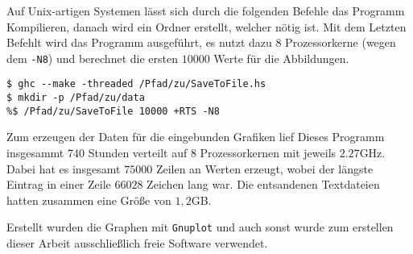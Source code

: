 Auf Unix-artigen Systemen lässt sich durch die folgenden Befehle das Programm
Kompilieren, danach wird ein Ordner erstellt, welcher nötig ist. Mit dem
Letzten Befehlt wird das Programm ausgeführt, es nutzt dazu 8 Prozessorkerne
(wegen dem \texttt{-N8}) und berechnet die ersten $10000$ Werte für die
Abbildungen.
\begin{lstlisting}[style=Bash]
$ ghc --make -threaded /Pfad/zu/SaveToFile.hs
$ mkdir -p /Pfad/zu/data
%$ /Pfad/zu/SaveToFile 10000 +RTS -N8
\end{lstlisting}
Zum erzeugen der Daten für die eingebunden Grafiken lief Dieses Programm
insgesammt $740$ Stunden verteilt auf $8$ Prozessorkernen mit jeweils
$2.27$GHz.
Dabei hat es insgesamt $75000$ Zeilen an Werten erzeugt, wobei der längste
Eintrag in einer Zeile $66028$ Zeichen lang war.
Die entsandenen Textdateien hatten zusammen eine Größe von $1,2$GB.

Erstellt wurden die Graphen mit \texttt{Gnuplot} und auch sonst wurde zum
erstellen dieser Arbeit ausschließlich freie Software verwendet.



